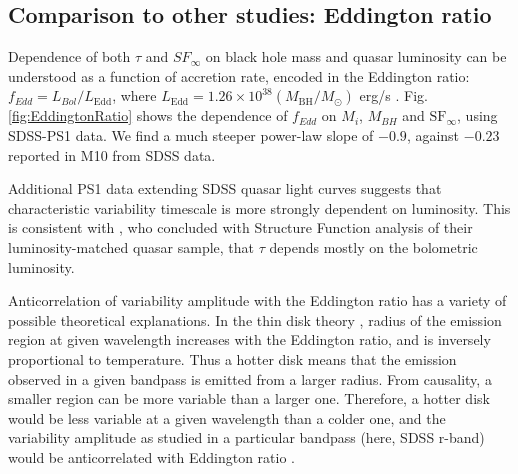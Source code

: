 \documentclass[twocolumn]{aastex62}
\let\oldAA\AA
\renewcommand{\AA}{\text{\normalfont\oldAA}}
\begin{document}
\begin{figure*}
\caption{Same as Fig.~\ref{fig:MacLeodCeleriteShen2011tau},  but fitting quasar absolute magnitude, and black hole mass  in Eq.~\ref{eq:powlawmodel} as a function of the asymptotic amplitude $f = SF_{\infty}$. New data from PS1 supports a slightly weaker dependence of variability amplitude with luminosity and black hole mass. }
\label{fig:MacLeodCeleriteShen2011sf}
\end{figure*} 



\subsection{Comparison to other studies: Eddington ratio}

Dependence of both $\tau$ and $SF_{\infty}$ on black hole mass and quasar luminosity can be understood as a function of accretion rate, encoded in the Eddington ratio: $f_{Edd} {=} L_{Bol}/L_{\mathrm{Edd}}$, where $L_{\mathrm{Edd}} {=} 1.26 {\times} 10^{38} (M_{\mathrm{BH}} / M_{\odot})$ erg/s \citep{shen2011}. Fig.\ref{fig:EddingtonRatio} shows the dependence of $f_{Edd}$ on $M_{i}$, $M_{BH}$ and $\mathrm{SF}_{\infty}$, using SDSS-PS1 data. We find a much steeper power-law slope of $-0.9$, against $-0.23$ reported in M10 from SDSS data. 


\begin{figure*}
\caption{Left : the Eddigton ratio $L/L_{Edd}$ (from \citealt{shen2011}) plotted as a function of $M_{BH}$  vs $M_{i}$. Right:  the asymptotic variability amplitude $SF_{\infty}$,  corrected for the wavelength dependence to $4000 \AA$, as a function of the Eddington ratio.  The slope of -0.9 (solid line) is much steeper than -0.23 found by M10 with the SDSS only data. }
\label{fig:EddingtonRatio}
\end{figure*} 

Additional PS1 data extending SDSS quasar light curves suggests that characteristic variability timescale is more strongly dependent on luminosity. This is consistent with \cite{sun2018}, who concluded with Structure Function analysis of their luminosity-matched quasar sample, that $\tau$ depends mostly on the bolometric luminosity. 


Anticorrelation of  variability amplitude with the Eddington ratio  has a variety of possible theoretical explanations. In the thin disk theory \cite{shakura1973, frank2002, netzer2013}, radius of the emission region at given wavelength increases with the Eddington ratio, and is inversely proportional to temperature\cite{rakshit2017}. Thus a hotter disk means that the emission observed in a given bandpass is emitted from a larger radius. From causality, a smaller region can be more variable than a larger one. Therefore, a  hotter disk would be less variable at a given wavelength than a colder one, and  the variability amplitude as studied in a particular bandpass (here, SDSS r-band) would be anticorrelated with Eddington ratio \citep{fausnaugh2016,edelson2015}. 
\end{document}

